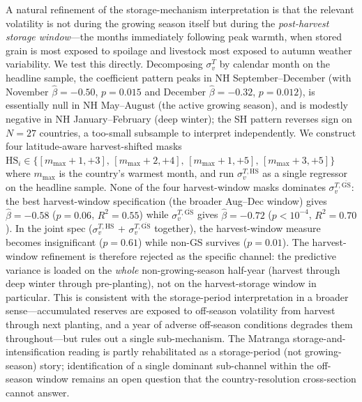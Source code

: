 \documentclass[11pt,letterpaper]{article}
\begin{document}
A natural refinement of the storage-mechanism interpretation is that the relevant volatility is not during the growing season itself but during the \emph{post-harvest storage window}---the months immediately following peak warmth, when stored grain is most exposed to spoilage and livestock most exposed to autumn weather variability. We test this directly. Decomposing $\sigma_v^T$ by calendar month on the headline sample, the coefficient pattern peaks in NH September--December (with November $\hat\beta=-0.50$, $p=0.015$ and December $\hat\beta=-0.32$, $p=0.012$), is essentially null in NH May--August (the active growing season), and is modestly negative in NH January--February (deep winter); the SH pattern reverses sign on $N=27$ countries, a too-small subsample to interpret independently. We construct four latitude-aware harvest-shifted masks $\mathrm{HS}_i \in \{[m_{\max}{+}1,{+}3],\, [m_{\max}{+}2,{+}4],\, [m_{\max}{+}1,{+}5],\, [m_{\max}{+}3,{+}5]\}$ where $m_{\max}$ is the country's warmest month, and run $\sigma_v^{T,\mathrm{HS}}$ as a single regressor on the headline sample. None of the four harvest-window masks dominates $\sigma_v^{T,\overline{\mathrm{GS}}}$: the best harvest-window specification (the broader Aug--Dec window) gives $\hat\beta = -0.58$ ($p = 0.06$, $R^2 = 0.55$) while $\sigma_v^{T,\overline{\mathrm{GS}}}$ gives $\hat\beta = -0.72$ ($p < 10^{-4}$, $R^2 = 0.70$). In the joint spec ($\sigma_v^{T,\mathrm{HS}}$ + $\sigma_v^{T,\overline{\mathrm{GS}}}$ together), the harvest-window measure becomes insignificant ($p = 0.61$) while non-GS survives ($p = 0.01$). The harvest-window refinement is therefore rejected as the specific channel: the predictive variance is loaded on the \emph{whole} non-growing-season half-year (harvest through deep winter through pre-planting), not on the harvest-storage window in particular. This is consistent with the storage-period interpretation in a broader sense---accumulated reserves are exposed to off-season volatility from harvest through next planting, and a year of adverse off-season conditions degrades them throughout---but rules out a single sub-mechanism. The Matranga storage-and-intensification reading is partly rehabilitated as a storage-period (not growing-season) story; identification of a single dominant sub-channel within the off-season window remains an open question that the country-resolution cross-section cannot answer.
\end{document}
